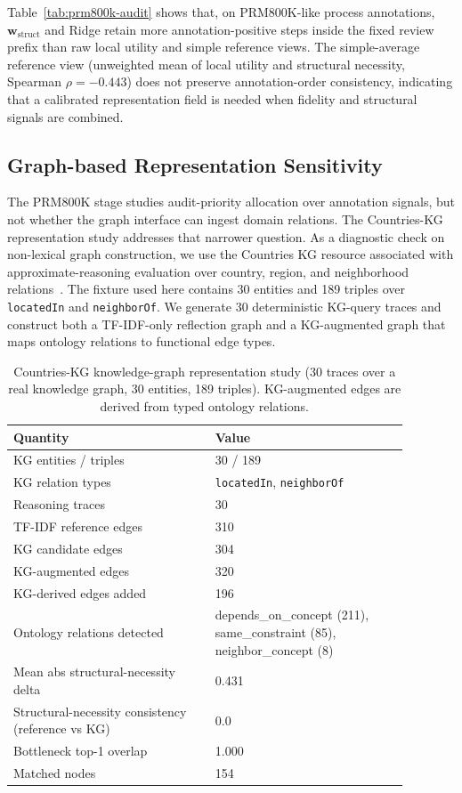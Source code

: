 \documentclass[a4paper,fleqn]{cas-sc}
\newcommand{\wstruct}{\ensuremath{\mathbf{w}_{\mathrm{struct}}}}
\begin{document}
Table~\ref{tab:prm800k-audit} shows that, on PRM800K-like process annotations, \wstruct{} and Ridge retain more annotation-positive steps inside the fixed review prefix than raw local utility and simple reference views. The simple-average reference view (unweighted mean of local utility and structural necessity, Spearman $\rho = -0.443$) does not preserve annotation-order consistency, indicating that a calibrated representation field is needed when fidelity and structural signals are combined.

\subsection{Graph-based Representation Sensitivity}
\label{sec:kg-pilot}

The PRM800K stage studies audit-priority allocation over annotation signals, but not whether the graph interface can ingest domain relations. The Countries-KG representation study addresses that narrower question. As a diagnostic check on non-lexical graph construction, we use the Countries KG resource associated with approximate-reasoning evaluation over country, region, and neighborhood relations~\cite{bouchard2015approximate}. The fixture used here contains 30 entities and 189 triples over \texttt{locatedIn} and \texttt{neighborOf}. We generate 30 deterministic KG-query traces and construct both a TF-IDF-only reflection graph and a KG-augmented graph that maps ontology relations to functional edge types.

\begin{table}[ht]
\caption{Countries-KG knowledge-graph representation study (30 traces over a real knowledge graph, 30 entities, 189 triples). KG-augmented edges are derived from typed ontology relations.}
\label{tab:kg-pilot}
\centering
\small
\renewcommand{\arraystretch}{1.08}
\begin{tabular}{Z{0.45\linewidth}Z{0.43\linewidth}}
\toprule
\textbf{Quantity} & \textbf{Value} \\
\midrule
KG entities / triples & 30 / 189 \\
KG relation types & \texttt{locatedIn}, \texttt{neighborOf} \\
Reasoning traces & 30 \\
TF-IDF reference edges & 310 \\
KG candidate edges & 304 \\
KG-augmented edges & 320 \\
KG-derived edges added & 196 \\
Ontology relations detected & depends\_on\_concept (211), same\_constraint (85), neighbor\_concept (8) \\
Mean abs structural-necessity delta & 0.431 \\
Structural-necessity consistency (reference vs KG) & 0.0 \\
Bottleneck top-1 overlap & 1.000 \\
Matched nodes & 154 \\
\bottomrule
\end{tabular}
\end{table}
\end{document}
